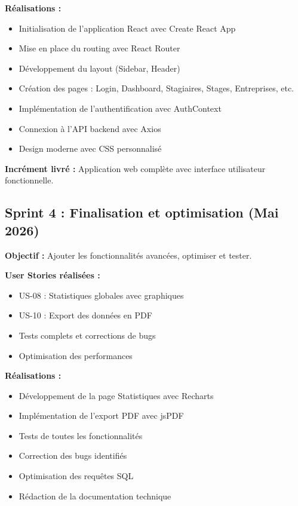 \documentclass[12pt,a4paper]{report}
\begin{document}
\textbf{Réalisations :}
\begin{itemize}[leftmargin=1cm]
    \item Initialisation de l'application React avec Create React App
    \item Mise en place du routing avec React Router
    \item Développement du layout (Sidebar, Header)
    \item Création des pages : Login, Dashboard, Stagiaires, Stages, Entreprises, etc.
    \item Implémentation de l'authentification avec AuthContext
    \item Connexion à l'API backend avec Axios
    \item Design moderne avec CSS personnalisé
\end{itemize}

\textbf{Incrément livré :} Application web complète avec interface utilisateur fonctionnelle.

\subsection{Sprint 4 : Finalisation et optimisation (Mai 2026)}

\textbf{Objectif :} Ajouter les fonctionnalités avancées, optimiser et tester.

\textbf{User Stories réalisées :}
\begin{itemize}[leftmargin=1cm]
    \item US-08 : Statistiques globales avec graphiques
    \item US-10 : Export des données en PDF
    \item Tests complets et corrections de bugs
    \item Optimisation des performances
\end{itemize}

\textbf{Réalisations :}
\begin{itemize}[leftmargin=1cm]
    \item Développement de la page Statistiques avec Recharts
    \item Implémentation de l'export PDF avec jsPDF
    \item Tests de toutes les fonctionnalités
    \item Correction des bugs identifiés
    \item Optimisation des requêtes SQL
    \item Rédaction de la documentation technique
\end{itemize}
\end{document}
